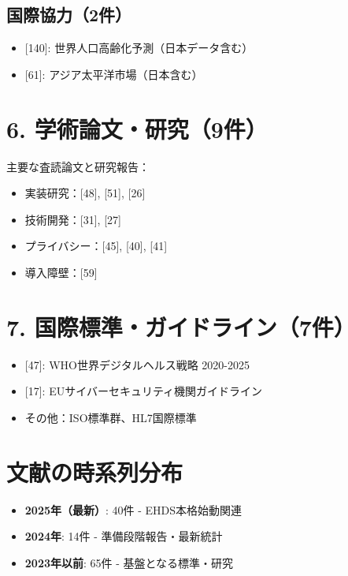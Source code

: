 \documentclass[
  a4paper,
  a4paper,
  11pt]{ltjsbook}
\providecommand{\tightlist}{%
  \setlength{\itemsep}{0pt}\setlength{\parskip}{0pt}}
\begin{document}
\subsection{国際協力（2件）}\label{ux56fdux969bux5354ux529b2ux4ef6}

\begin{itemize}
\tightlist
\item
  {[}140{]}: 世界人口高齢化予測（日本データ含む）
\item
  {[}61{]}: アジア太平洋市場（日本含む）
\end{itemize}

\section{6.
学術論文・研究（9件）}\label{ux5b66ux8853ux8ad6ux6587ux7814ux7a769ux4ef6}

主要な査読論文と研究報告：

\begin{itemize}
\tightlist
\item
  実装研究：{[}48{]}, {[}51{]}, {[}26{]}
\item
  技術開発：{[}31{]}, {[}27{]}
\item
  プライバシー：{[}45{]}, {[}40{]}, {[}41{]}
\item
  導入障壁：{[}59{]}
\end{itemize}

\section{7.
国際標準・ガイドライン（7件）}\label{ux56fdux969bux6a19ux6e96ux30acux30a4ux30c9ux30e9ux30a4ux30f37ux4ef6}

\begin{itemize}
\tightlist
\item
  {[}47{]}: WHO世界デジタルヘルス戦略 2020-2025
\item
  {[}17{]}: EUサイバーセキュリティ機関ガイドライン
\item
  その他：ISO標準群、HL7国際標準
\end{itemize}

\section{文献の時系列分布}\label{ux6587ux732eux306eux6642ux7cfbux5217ux5206ux5e03}

\begin{itemize}
\tightlist
\item
  \textbf{2025年（最新）}: 40件 - EHDS本格始動関連
\item
  \textbf{2024年}: 14件 - 準備段階報告・最新統計
\item
  \textbf{2023年以前}: 65件 - 基盤となる標準・研究
\end{itemize}
\end{document}
